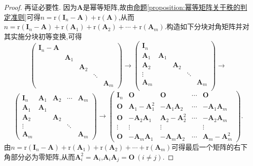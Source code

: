 \documentclass[../../main.tex]{subfiles}%
\begin{document}
\begin{proof}
再证必要性. 因为\(\boldsymbol{A}\)是幂等矩阵,故由\hyperref[proposition:幂等矩阵关于秩的判定准则]{命题\ref{proposition:幂等矩阵关于秩的判定准则}}可得\(n=\text{r}(\boldsymbol{I}_n - \boldsymbol{A})+\text{r}(\boldsymbol{A})\),从而\(n=\text{r}(\boldsymbol{I}_n - \boldsymbol{A})+\text{r}(\boldsymbol{A}_1)+\text{r}(\boldsymbol{A}_2)+\cdots+\text{r}(\boldsymbol{A}_m)\).构造如下分块对角矩阵并对其实施分块初等变换,可得
\[
\begin{pmatrix}
\boldsymbol{I}_n - \boldsymbol{A}&&&&\\
&\boldsymbol{A}_1&&&\\
&&\boldsymbol{A}_2&&\\
&&&\ddots&\\
&&&&\boldsymbol{A}_m
\end{pmatrix}\to
\left( \begin{matrix}
\boldsymbol{I}_n&		&		&		&		\\
\boldsymbol{A}_1&		\boldsymbol{A}_1&		&		&		\\
\boldsymbol{A}_2&		&		\boldsymbol{A}_2&		&		\\
\vdots&		&		&		\ddots&		\\
\boldsymbol{A}_m&		&		&		&		\boldsymbol{A}_m\\
\end{matrix} \right) \to
\]
\[
\begin{pmatrix}
\boldsymbol{I}_n&\boldsymbol{A}_1&\boldsymbol{A}_2&\cdots&\boldsymbol{A}_m\\
\boldsymbol{A}_1&\boldsymbol{A}_1&&&\\
\boldsymbol{A}_2&&\boldsymbol{A}_2&&\\
\vdots&&&\ddots&\\
\boldsymbol{A}_m&&&&\boldsymbol{A}_m
\end{pmatrix}\to
\begin{pmatrix}
\boldsymbol{I}_n&\boldsymbol{O}&\boldsymbol{O}&\cdots&\boldsymbol{O}\\
\boldsymbol{O}&\boldsymbol{A}_1 - \boldsymbol{A}_1^2&-\boldsymbol{A}_1\boldsymbol{A}_2&\cdots&-\boldsymbol{A}_1\boldsymbol{A}_m\\
\boldsymbol{O}&-\boldsymbol{A}_2\boldsymbol{A}_1&\boldsymbol{A}_2 - \boldsymbol{A}_2^2&\cdots&-\boldsymbol{A}_2\boldsymbol{A}_m\\
\vdots&\vdots&\vdots&&\vdots\\
\boldsymbol{O}&-\boldsymbol{A}_m\boldsymbol{A}_1&-\boldsymbol{A}_m\boldsymbol{A}_2&\cdots&\boldsymbol{A}_m - \boldsymbol{A}_m^2
\end{pmatrix}.
\]
由\(n=\text{r}(\boldsymbol{I}_n - \boldsymbol{A})+\text{r}(\boldsymbol{A}_1)+\text{r}(\boldsymbol{A}_2)+\cdots+\text{r}(\boldsymbol{A}_m)\)可得最后一个矩阵的右下角部分必为零矩阵,从而\(\boldsymbol{A}_i^2 = \boldsymbol{A}_i\),\(\boldsymbol{A}_i\boldsymbol{A}_j = \boldsymbol{O}\ (i\neq j)\).

\end{proof}
\end{document}

